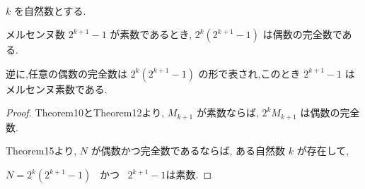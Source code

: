 \begin{theorem}\label{even_and_perfect_iff}
\leanok{}~\

\(k\) を自然数とする.

メルセンヌ数 \(2^{k+1} - 1\) が素数であるとき, \(2^k(2^{k+1} - 1)\) は偶数の完全数である.

逆に,任意の偶数の完全数は \(2^k(2^{k+1} - 1)\) の形で表され,このとき \(2^{k+1} - 1\) はメルセンヌ素数である.

\end{theorem}

\begin{proof}
Theorem10とTheorem12より, \(M_{k+1}\) が素数ならば, \(2^kM_{k+1}\) は偶数の完全数.

Theorem15より, \(N\) が偶数かつ完全数であるならば, ある自然数 \(k\) が存在して,

\(N = 2^k(2^{k+1} - 1)\) ~かつ~ \(2^{k+1} - 1 \text{は素数}\).
\end{proof}
